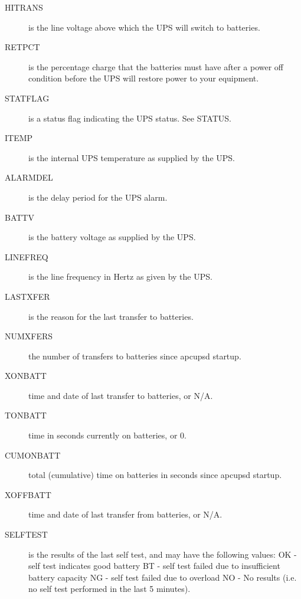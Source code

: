 {{{{{{{{\begin{description}
\item [HITRANS]
   is the line voltage above which the UPS will switch to batteries.  

\item [RETPCT]
   is the percentage charge that the batteries must have after a power off
condition before the UPS will restore power to your equipment.  

\item [STATFLAG]
   is a status flag indicating the UPS status. See STATUS.  

\item [ITEMP]
   is the internal UPS temperature as supplied by the UPS.  

\item [ALARMDEL]
   is the delay period for the UPS alarm.  

\item [BATTV]
   is the battery voltage as supplied by the UPS.  

\item [LINEFREQ]
   is the line frequency in Hertz as given by the UPS.  

\item [LASTXFER]
   is the reason for the last transfer to batteries.  

\item [NUMXFERS]
   the number of transfers to batteries since apcupsd startup.  

\item [XONBATT]
   time and date of last transfer to batteries, or N/A.  

\item [TONBATT]
   time in seconds currently on batteries, or 0.  

\item [CUMONBATT]
   total (cumulative) time on batteries in seconds since apcupsd startup.  

\item [XOFFBATT]
   time and date of last transfer from batteries, or N/A.  

\item [SELFTEST]
   is the results of the last self test, and may have the following values: OK -
self test indicates good battery BT - self test failed due to insufficient
battery capacity NG - self test failed due to overload NO - No results (i.e.
no self test performed in the last 5 minutes).  


\end{description}}}}}}}}}
